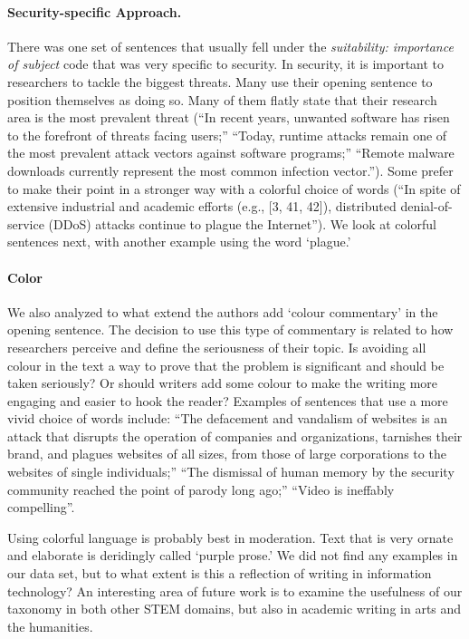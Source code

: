 \documentclass[sigconf,anonymous]{acmart}
\begin{document}
\paragraph{Security-specific Approach.} There was one set of sentences that usually fell under the \textit{suitability: importance of subject} code that was very specific to security. In security, it is important to researchers to tackle the biggest threats. Many use their opening sentence to position themselves as doing so. Many of them flatly state that their research area is the most prevalent threat (``In recent years, unwanted software has risen to the forefront of threats facing users;'' ``Today, runtime attacks remain one of the most prevalent attack vectors against software programs;'' ``Remote malware downloads currently represent the most common infection vector.''). Some prefer to make their point in a stronger way with a colorful choice of words (``In spite of extensive industrial and academic efforts (e.g., [3, 41, 42]), distributed denial-of-service (DDoS) attacks continue to plague the Internet''). We look at colorful sentences next, with another example using the word `plague.'

\paragraph{Color} We also analyzed to what extend the authors add `colour commentary' in the opening sentence. The decision to use this type of commentary is related to how researchers perceive and define the seriousness of their topic. Is avoiding all colour in the text a way to prove that the problem is significant and should be taken seriously? Or should writers add some colour to make the writing more engaging and easier to hook the reader? Examples of sentences that use a more vivid choice of words include: ``The defacement and vandalism of websites is an attack that disrupts the operation of companies and organizations, tarnishes their brand, and plagues websites of all sizes, from those of large corporations to the websites of single individuals;'' ``The dismissal of human memory by the security community reached the point of parody long ago;'' ``Video is ineffably compelling''. 

Using colorful language is probably best in moderation. Text that is very ornate and elaborate is deridingly called `purple prose.' We did not find any examples in our data set, but to what extent is this a reflection of writing in information technology? An interesting area of future work is to examine the usefulness of our taxonomy in both other STEM domains, but also in academic writing in arts and the humanities.
	
\end{document}

